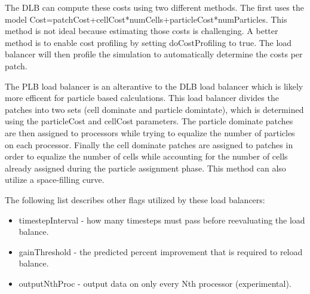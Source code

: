 The DLB can compute these costs using two different methods.  The first uses
the model Cost=patchCost+cellCost*numCells+particleCost*numParticles.  This
method is not ideal because estimating those costs is challenging.  A better
method is to enable cost profiling by setting doCostProfiling to true.  The 
load balancer will then profile the simulation to automatically determine the
costs per patch.

The PLB load balancer is an alterantive to the DLB load balancer which is
likely more efficent for particle based calculations.  This load balancer
divides the patches into two sets (cell dominate and particle domintate), 
which is determined using the particleCost and cellCost parameters.
The particle dominate patches are then assigned to processors while trying
to equalize the number of particles on each processor.  Finally the 
cell dominate patches are assigned to patches in order to equalize the number
of cells while accounting for the number of cells already assigned during 
the particle assignment phase.  This method can also utilize a space-filling
curve.  

The following list describes other flags utilized by these load balancers:
\begin{itemize}
  \item timestepInterval - how many timesteps must pass before reevaluating the load balance.  
  \item gainThreshold - the predicted percent improvement that is required to reload balance.  
  \item outputNthProc - output data on only every Nth processor (experimental). 
\end{itemize}

